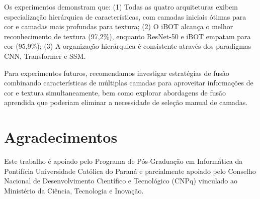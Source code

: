 \documentclass[conference]{IEEEtran}
\begin{document}
Os experimentos demonstram que: (1) Todas as quatro arquiteturas exibem especialização hierárquica de características, com camadas iniciais ótimas para cor e camadas mais profundas para textura; (2) O iBOT alcança o melhor reconhecimento de textura (97,2\%), enquanto ResNet-50 e iBOT empatam para cor (95,9\%); (3) A organização hierárquica é consistente através dos paradigmas CNN, Transformer e SSM.

Para experimentos futuros, recomendamos investigar estratégias de fusão combinando características de múltiplas camadas para aproveitar informações de cor e textura simultaneamente, bem como explorar abordagens de fusão aprendida que poderiam eliminar a necessidade de seleção manual de camadas.


\section*{Agradecimentos}
Este trabalho é apoiado pelo Programa de Pós-Graduação em Informática da Pontifícia Universidade Católica do Paraná e parcialmente apoiado pelo Conselho Nacional de Desenvolvimento Científico e Tecnológico (CNPq) vinculado ao Ministério da Ciência, Tecnologia e Inovação.
\end{document}
